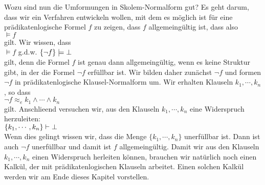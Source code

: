 Wozu sind nun die Umformungen in Skolem-Normalform gut?  Es geht darum, dass wir 
ein Verfahren entwickeln wollen, mit dem es m\"{o}glich ist f\"{u}r eine pr\"{a}dikatenlogische Formel
$f$ zu zeigen, dass $f$ allgemeing\"{u}ltig ist, dass also \\[0.2cm]
\hspace*{1.3cm} $\models f$ \\[0.2cm]
gilt.  Wir wissen, dass \\[0.2cm]
\hspace*{1.3cm} $\models f$ \quad g.d.w. \quad $\{\neg f\} \models \bot$ \\[0.2cm]
gilt, denn die Formel $f$ ist genau dann allgemeing\"{u}ltig, wenn es keine Struktur gibt, in
der die Formel $\neg f$ erf\"{u}llbar ist. 
 Wir bilden daher zun\"{a}chst $\neg f$ und formen $\neg f$ in pr\"{a}dikatenlogische
Klausel-Normalform um.  Wir erhalten Klauseln $k_1, \cdots, k_n$, so dass  \\[0.2cm]
\hspace*{1.3cm} $\neg f \approx_e k_1 \wedge \cdots \wedge k_n$ \\[0.2cm]
gilt.  Anschlie\3end versuchen wir,
aus den Klauseln $k_1,\cdots,k_n$ eine Widerspruch herzuleiten: \\[0.2cm]
\hspace*{1.3cm} $\{k_1, \cdots, k_n\} \vdash \bot$ \\[0.2cm]
Wenn dies gelingt wissen wir, dass die Menge $\{k_1, \cdots, k_n\}$ unerf\"{u}llbar ist.
Dann ist auch $\neg f$ unerf\"{u}llbar und damit ist $f$ allgemeing\"{u}ltig.
Damit wir aus den Klauseln $k_1,\cdots,k_n$ einen Widerspruch herleiten k\"{o}nnen,
brauchen wir nat\"{u}rlich noch einen Kalk\"{u}l, der mit pr\"{a}dikatenlogischen Klauseln arbeitet. 
Einen solchen Kalk\"{u}l werden wir am Ende dieses Kapitel vorstellen.

